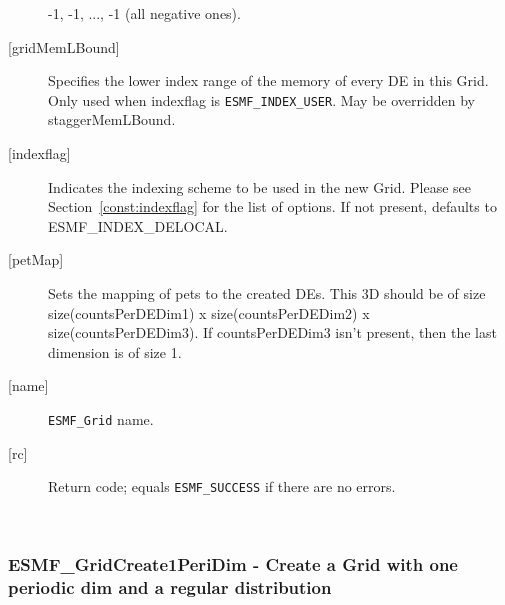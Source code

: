 \begin{description}
      -1, -1, ..., -1 (all negative ones).
   \item[{[gridMemLBound]}]
        Specifies the lower index range of the memory of every DE in this Grid.
        Only used when indexflag is {\tt ESMF\_INDEX\_USER}. May be overridden
        by staggerMemLBound.
   \item[{[indexflag]}]
        Indicates the indexing scheme to be used in the new Grid. Please see
        Section~\ref{const:indexflag} for the list of options. If not present,
        defaults to ESMF\_INDEX\_DELOCAL.
   \item[{[petMap]}]
         \begin{sloppypar}
         Sets the mapping of pets to the created DEs. This 3D
         should be of size size(countsPerDEDim1) x size(countsPerDEDim2) x
         size(countsPerDEDim3). If countsPerDEDim3 isn't present, then
         the last dimension is of size 1.
         \end{sloppypar}
   \item[{[name]}]
            {\tt ESMF\_Grid} name.
   \item[{[rc]}]
        Return code; equals {\tt ESMF\_SUCCESS} if there are no errors.
   \end{description}
   
 
\mbox{}\hrulefill\ 
 
\subsubsection [ESMF\_GridCreate1PeriDim] {ESMF\_GridCreate1PeriDim - Create a Grid with one periodic dim and a regular distribution}


